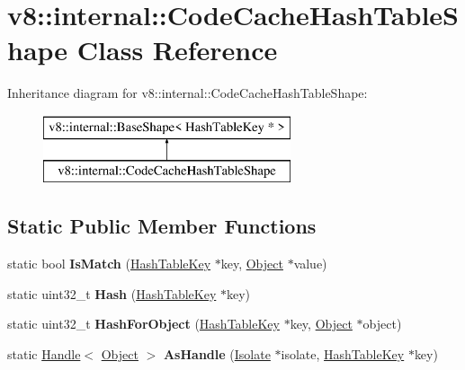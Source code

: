 \hypertarget{classv8_1_1internal_1_1_code_cache_hash_table_shape}{}\section{v8\+:\+:internal\+:\+:Code\+Cache\+Hash\+Table\+Shape Class Reference}
\label{classv8_1_1internal_1_1_code_cache_hash_table_shape}
Inheritance diagram for v8\+:\+:internal\+:\+:Code\+Cache\+Hash\+Table\+Shape\+:\begin{figure}[H]
\begin{center}
\leavevmode
\includegraphics[height=2.000000cm]{classv8_1_1internal_1_1_code_cache_hash_table_shape}
\end{center}
\end{figure}
\subsection*{Static Public Member Functions}
\begin{DoxyCompactItemize}
\item 
\hypertarget{classv8_1_1internal_1_1_code_cache_hash_table_shape_a65ae88e72ba1a36856b9e99e7bf598d0}{}static bool {\bfseries Is\+Match} (\hyperlink{classv8_1_1internal_1_1_hash_table_key}{Hash\+Table\+Key} $\ast$key, \hyperlink{classv8_1_1internal_1_1_object}{Object} $\ast$value)\label{classv8_1_1internal_1_1_code_cache_hash_table_shape_a65ae88e72ba1a36856b9e99e7bf598d0}

\item 
\hypertarget{classv8_1_1internal_1_1_code_cache_hash_table_shape_a7493323254a2011e99d4d52fa4a97596}{}static uint32\+\_\+t {\bfseries Hash} (\hyperlink{classv8_1_1internal_1_1_hash_table_key}{Hash\+Table\+Key} $\ast$key)\label{classv8_1_1internal_1_1_code_cache_hash_table_shape_a7493323254a2011e99d4d52fa4a97596}

\item 
\hypertarget{classv8_1_1internal_1_1_code_cache_hash_table_shape_aa80bc42c1326645e7e75d99e436c4f3c}{}static uint32\+\_\+t {\bfseries Hash\+For\+Object} (\hyperlink{classv8_1_1internal_1_1_hash_table_key}{Hash\+Table\+Key} $\ast$key, \hyperlink{classv8_1_1internal_1_1_object}{Object} $\ast$object)\label{classv8_1_1internal_1_1_code_cache_hash_table_shape_aa80bc42c1326645e7e75d99e436c4f3c}

\item 
\hypertarget{classv8_1_1internal_1_1_code_cache_hash_table_shape_ab9a2d1ce5a124589a3baeeae7c373f73}{}static \hyperlink{classv8_1_1internal_1_1_handle}{Handle}$<$ \hyperlink{classv8_1_1internal_1_1_object}{Object} $>$ {\bfseries As\+Handle} (\hyperlink{classv8_1_1internal_1_1_isolate}{Isolate} $\ast$isolate, \hyperlink{classv8_1_1internal_1_1_hash_table_key}{Hash\+Table\+Key} $\ast$key)\label{classv8_1_1internal_1_1_code_cache_hash_table_shape_ab9a2d1ce5a124589a3baeeae7c373f73}

\end{DoxyCompactItemize}

